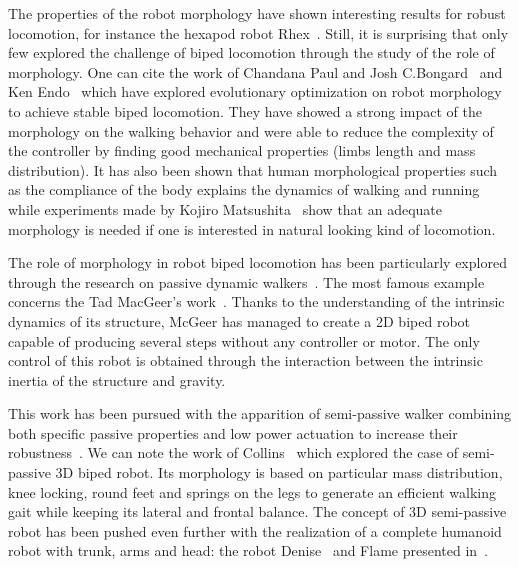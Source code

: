 The properties of the robot morphology have shown interesting results for robust locomotion, for instance the hexapod robot Rhex~\cite{saranli2001rhex}. Still, it is surprising that only few explored the challenge of biped locomotion through the study of the role of morphology.
One can cite the work of Chandana Paul and Josh C.Bongard~\cite{paul2001road} and Ken Endo~\cite{endo2002co} which have explored evolutionary optimization on robot morphology to achieve stable biped locomotion. They have showed a strong impact of the morphology on the walking behavior and were able to reduce the complexity of the controller by finding good mechanical properties (limbs length and mass distribution). It has also been shown that human morphological properties such as the compliance of the body explains the dynamics of walking and running \cite{Geyer2006} while experiments made by Kojiro Matsushita~\cite{matsushita2005locomoting} show that an adequate morphology is needed if one is interested in natural looking kind of locomotion.


The role of morphology in robot biped locomotion has been particularly explored through the research on passive dynamic walkers~\cite{wisse2007passive}. The most famous example concerns the Tad MacGeer's work~\cite{mcgeer1990passive}. Thanks to the understanding of the intrinsic dynamics of its structure, McGeer has managed to create a 2D biped robot capable of producing several steps without any controller or motor.
The only control of this robot is obtained through the interaction between the intrinsic inertia of the structure and gravity.

\begin{figure}[]
\centering
    \hfil
    \caption{}
    \label{fig:mcgeer_work}
\end{figure}

This work has been pursued with the apparition of semi-passive walker combining both specific passive properties and low power actuation to increase their robustness~\cite{Anderson2005}. We can note the work of Collins~\cite{collins2005bipedal} which explored the case of semi-passive 3D biped robot. Its morphology is based on particular mass distribution, knee locking, round feet and springs on the legs to generate an efficient walking gait while keeping its lateral and frontal balance.
The concept of 3D semi-passive robot has been pushed even further with the realization of a complete humanoid robot with trunk, arms and head: the robot Denise~\cite{wisse2005three} and Flame presented in~\cite{Hobbelen2008}.

